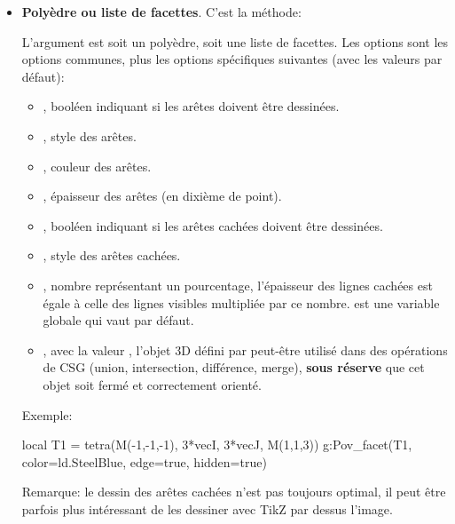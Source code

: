 \begin{itemize}
    \item \textbf{Polyèdre ou liste de facettes}. C'est la méthode: 
    
    L'argument  est soit un polyèdre, soit une liste de facettes. Les options sont les options communes, plus les options spécifiques suivantes (avec les valeurs par défaut): 
    \begin{itemize}
        \item {}, booléen indiquant si les arêtes doivent être dessinées.
        \item {}, style des arêtes.
        \item {}, couleur des arêtes.
        \item {}, épaisseur des arêtes (en dixième de point).
        \item {}, booléen indiquant si les arêtes cachées doivent être dessinées.
        \item {}, style des arêtes cachées.
        \item {}, nombre représentant un pourcentage, l'épaisseur des lignes cachées est égale à celle des lignes visibles multipliée par ce nombre.  est une variable globale qui vaut  par défaut.
        \item {}, avec  la valeur \true, l'objet 3D défini par  peut-être utilisé dans des opérations de CSG (union, intersection, différence, merge), \textbf{sous réserve} que cet objet soit fermé et correctement orienté.
    \end{itemize}
    Exemple:
    \begin{Luacode}
    local T1 = tetra(M(-1,-1,-1), 3*vecI, 3*vecJ, M(1,1,3))
    g:Pov_facet(T1, {color=ld.SteelBlue, edge=true, hidden=true})
    \end{Luacode}
    Remarque: le dessin des arêtes cachées n'est pas toujours optimal, il peut être parfois plus intéressant de les dessiner avec TikZ par dessus l'image.
    

\end{itemize}
